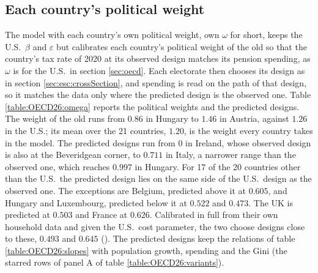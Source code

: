 \subsection{Each country's political weight}\label{app:oecd26:layer2}
The model with each country's own political weight, own $\omega$ for short, keeps the U.S.\ $\beta$ and $\varepsilon$ but calibrates each country's political weight of the old so that the country's tax rate of 2020 at its observed design matches its pension spending, as $\omega$ is for the U.S.\ in section \ref{sec:oecd}. Each electorate then chooses its design as in section \ref{sec:esc:crossSection}, and spending is read on the path of that design, so it matches the data only where the predicted design is the observed one. Table \ref{table:OECD26:omega} reports the political weights and the predicted designs. The weight of the old runs from $0.86$ in Hungary to $1.46$ in Austria, against $1.26$ in the U.S.; its mean over the 21 countries, $1.20$, is the weight every country takes in the model. The predicted designs run from $0$ in Ireland, whose observed design is also at the Beveridgean corner, to $0.711$ in Italy, a narrower range than the observed one, which reaches $0.997$ in Hungary. For 17 of the 20 countries other than the U.S.\ the predicted design lies on the same side of the U.S.\ design as the observed one. The exceptions are Belgium, predicted above it at $0.605$, and Hungary and Luxembourg, predicted below it at $0.522$ and $0.473$. The UK is predicted at $0.503$ and France at $0.626$. Calibrated in full from their own household data and given the U.S.\ cost parameter, the two choose designs close to these, $0.493$ and $0.645$ (). The predicted designs keep the relations of table \ref{table:OECD26:slopes} with population growth, spending and the Gini (the starred rows of panel A of table \ref{table:OECD26:variants}).



